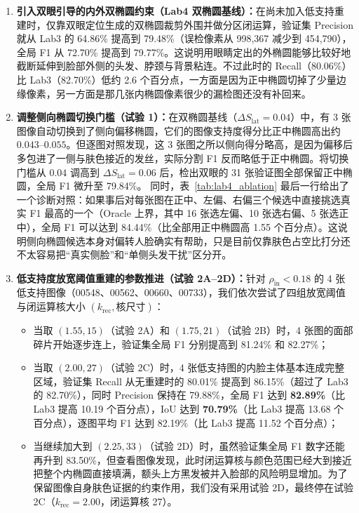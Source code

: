 \begin{enumerate}
\item \textbf{引入双眼引导的内外双椭圆约束（Lab4 双椭圆基线）：}在尚未加入低支持重建时，仅靠双眼定位生成的双椭圆裁剪外围并做分区闭运算，验证集 Precision 就从 Lab3 的 64.86\% 提高到 79.48\%（误检像素从 998,367 减少到 454,790），全局 F1 从 72.70\% 提高到 79.77\%。这说明用眼睛定出的外椭圆能够比较好地截断延伸到脸部外侧的头发、脖颈与背景粘连。不过此时的 Recall（80.06\%）比 Lab3（82.70\%）低约 2.6 个百分点，一方面是因为正中椭圆切掉了少量边缘像素，另一方面是那几张内椭圆像素很少的漏检图还没有补回来。
\item \textbf{调整侧向椭圆切换门槛（试验 1）：}在双椭圆基线（$\Delta S_{\text{lat}}=0.04$）中，有 3 张图像自动切换到了侧向偏移椭圆，它们的图像支持度得分比正中椭圆高出约 $0.043\text{--}0.055$。但逐图对照发现，这 3 张图之所以侧向得分略高，是因为偏移后多包进了一侧与肤色接近的发丝，实际分割 F1 反而略低于正中椭圆。将切换门槛从 $0.04$ 调高到 $\Delta S_{\text{lat}}=0.06$ 后，检出双眼的 31 张验证图全部保留正中椭圆，全局 F1 微升至 79.84\%。
同时，表~\ref{tab:lab4_ablation} 最后一行给出了一个诊断对照：如果事后对每张图在正中、左偏、右偏三个候选中直接挑选真实 F1 最高的一个（Oracle 上界，其中 16 张选左偏、10 张选右偏、5 张选正中），全局 F1 可以达到 84.44\%（比全部用正中椭圆高 1.55 个百分点）。这说明侧向椭圆候选本身对偏转人脸确实有帮助，只是目前仅靠肤色占空比打分还不太容易把“真实侧脸”和“单侧头发干扰”区分开。
\item \textbf{低支持度放宽阈值重建的参数推进（试验 2A--2D）：}针对 $\rho_{\text{in}}<0.18$ 的 4 张低支持图像（00548、00562、00660、00733），我们依次尝试了四组放宽阈值与闭运算核大小 $(k_{\text{rec}}, \text{核尺寸})$：
\begin{itemize}
\item 当取 $(1.55, 15)$（试验 2A）和 $(1.75, 21)$（试验 2B）时，4 张图的面部碎片开始逐步连上，验证集全局 F1 分别提高到 81.24\% 和 82.27\%；
\item 当取 $(2.00, 27)$（试验 2C）时，4 张低支持图的内脸主体基本连成完整区域，验证集 Recall 从无重建时的 80.01\% 提高到 86.15\%（超过了 Lab3 的 82.70\%），同时 Precision 保持在 79.88\%，全局 F1 达到 \textbf{82.89\%}（比 Lab3 提高 10.19 个百分点），IoU 达到 \textbf{70.79\%}（比 Lab3 提高 13.68 个百分点），逐图平均 F1 达到 82.19\%（比 Lab3 提高 11.52 个百分点）；
\item 当继续加大到 $(2.25, 33)$（试验 2D）时，虽然验证集全局 F1 数字还能再升到 83.50\%，但查看图像发现，此时闭运算核与颜色范围已经大到接近把整个内椭圆直接填满，额头上方黑发被并入脸部的风险明显增加。为了保留图像自身肤色证据的约束作用，我们没有采用试验 2D，最终停在试验 2C（$k_{\text{rec}}=2.00$，闭运算核 27）。
\end{itemize}
\end{enumerate}


